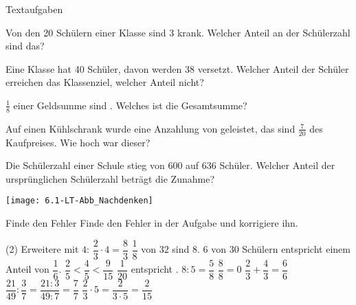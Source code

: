 \documentclass[12pt,a5paper,landscape]{scrartcl}
\begin{document}
	\begin{karte2}[\symEinzel]{Textaufgaben}
		\begin{minipage}{\textwidth-4.5cm}
			\begin{enumeratea}
				\item Von den 20 Schülern einer Klasse sind 3 krank. Welcher Anteil an der Schülerzahl sind das?
				
				\item Eine Klasse hat 40 Schüler, davon werden 38 versetzt. Welcher Anteil der Schüler erreichen das Klassenziel, welcher Anteil nicht?
				
				\item $\tfrac{1}{8}$ einer Geldsumme sind . Welches ist die Gesamtsumme?
				
				\item Auf einen Kühlschrank wurde eine Anzahlung von  geleistet, das sind $\tfrac{7}{20}$ des Kaufpreises. Wie hoch war dieser?
				
				\item Die Schülerzahl einer Schule stieg von 600 auf 636 Schüler. Welcher Anteil der ursprünglichen Schülerzahl beträgt die Zunahme?
			\end{enumeratea}
		\end{minipage}\hfill\begin{minipage}{4cm}
			\texttt{[image: 6.1-LT-Abb\_Nachdenken]}
		\end{minipage}
	\end{karte2}
	
	\leereKarte
	
	\begin{karte2}{Finde den Fehler}
		Finde den Fehler in der Aufgabe und korrigiere ihn.
		
		\begin{tasks}(2)
			\task Erweitere mit $4$: $\dfrac{2}{3}\cdot 4 = \dfrac{8}{3}$
			\task $\dfrac{1}{8}$ von $32$ sind $8$.
			\task $6$ von $30$ Schülern entspricht einem Anteil von $\dfrac{1}{6}$.
			\task $\dfrac{2}{5} < \dfrac{4}{5} < \dfrac{9}{15}$
			\task $\dfrac{1}{20}$ entspricht .
			\task $8: 5 =\dfrac{5}{8}$
			\task $\dfrac{8}{8} = 0$
			\task $\dfrac{2}{3} + \dfrac{4}{3} = \dfrac{6}{6}$
			\task $\dfrac{21}{49}: \dfrac{3}{7} = \dfrac{21 : 3}{49 : 7} = \dfrac{7}{7}$
			\task $\dfrac{2}{3}\cdot 5 = \dfrac{2}{3\cdot 5} = \dfrac{2}{15}$
		\end{tasks}
	\end{karte2}
	
\end{document}
